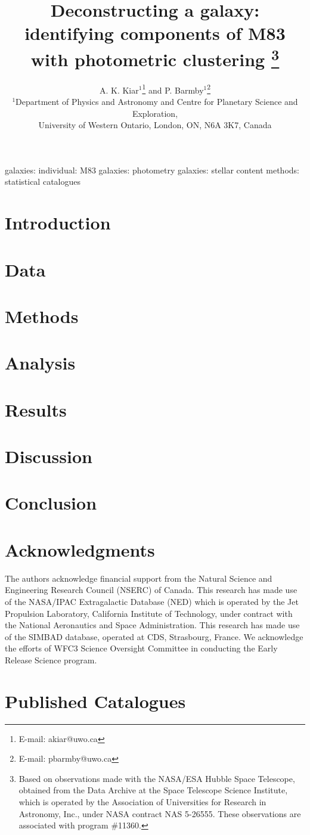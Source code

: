 \documentclass[useAMS,usenatbib]{mn2e}
\title[Deconstructing M83]{Deconstructing a galaxy: identifying components of M83 with photometric clustering%
\footnote{  
Based on observations made with the NASA/ESA Hubble Space Telescope, obtained from the Data Archive at the Space Telescope Science Institute, which is operated by the Association of Universities for Research in Astronomy, Inc., under NASA contract NAS 5-26555. These observations are associated with program \#11360.
}
}
\author[Kiar \& Barmby]
{
A. K. Kiar$^{1}$\thanks{E-mail: akiar@uwo.ca} and
P. Barmby$^{1}$\thanks{E-mail: pbarmby@uwo.ca}\\
$^{1}$Department of Physics and Astronomy and Centre for Planetary Science and Exploration,\\
University of Western Ontario, London, ON, N6A 3K7, Canada\\
}
\begin{document}
\date{}


\maketitle
\label{firstpage}

\begin{abstract}

\end{abstract}

\begin{keywords}
  galaxies: individual: M83
  galaxies: photometry
  galaxies: stellar content
  methods: statistical
  catalogues %
\end{keywords}

\section{Introduction}

\section{Data}

\section{Methods}

\section{Analysis}

\section{Results}

\section{Discussion}

\section{Conclusion}



\section*{Acknowledgments}

The authors acknowledge financial support from the Natural Science and Engineering Research Council (NSERC) of Canada.
This research has made use of the NASA/IPAC Extragalactic Database (NED) which is operated by the Jet Propulsion Laboratory,
California Institute of Technology, under contract with the National Aeronautics and Space Administration. 
This research has made use of the SIMBAD database, operated at CDS, Strasbourg, France.
We acknowledge the efforts of WFC3 Science Oversight Committee in conducting the Early Release Science program.

\appendix
\section{Published Catalogues}



{}

\bsp

\label{lastpage}
\end{document}
